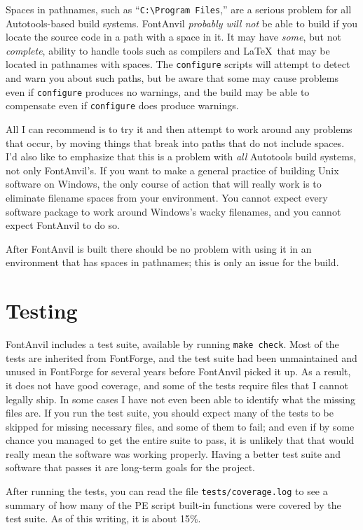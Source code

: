 Spaces in pathnames, such as ``\texttt{C:\textbackslash{}Program
Files},'' are a serious problem for all Autotools-based build systems. 
FontAnvil \emph{probably will not} be able to build if you locate the source
code in a path with a space in it.  It may have \emph{some}, but not
\emph{complete}, ability to handle tools such as compilers and \LaTeX\ that
may be located in pathnames with spaces.  The \texttt{configure} scripts
will attempt to detect and warn you about such paths, but be aware that some
may cause problems even if \texttt{configure} produces no warnings, and the
build may be able to compensate even if \texttt{configure} does produce
warnings.

All I can recommend is to try it and then attempt to work around
any problems that occur, by moving things that break into paths that do
not include spaces.  I'd also like to emphasize that this is a problem
with \emph{all} Autotools build systems, not only FontAnvil's.  If you want
to make a general practice of building Unix software on Windows, the only
course of action that will really work is to eliminate filename spaces from
your environment.  You cannot expect every software package to work around
Windows's wacky filenames, and you cannot expect FontAnvil to do so.

After FontAnvil is built there should be no problem with using it in an
environment that has spaces in pathnames; this is only an issue for the
build.

\section{Testing}

FontAnvil includes a test suite, available by running \texttt{make check}. 
Most of the tests are inherited from FontForge, and the test suite had been
unmaintained and unused in FontForge for several years before FontAnvil
picked it up.  As a result, it does not have good coverage, and some of the
tests require files that I cannot legally ship.  In some cases I have not
even been able to identify what the missing files are.  If you run the test
suite, you should expect many of the tests to be skipped for missing
necessary files, and some of them to fail; and even if by some chance you
managed to get the entire suite to pass, it is unlikely that that would
really mean the software was working properly.  Having a better test suite
and software that passes it are long-term goals for the project.

After running the tests, you can read the file \texttt{tests/coverage.log}
to see a summary of how many of the PE script built-in functions were
covered by the test suite.  As of this writing, it is about 15\%.

